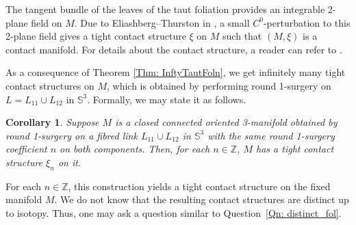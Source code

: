 \documentclass{amsart}
\theoremstyle{plain}
\newtheorem{cor}{Corollary}
\theoremstyle{remark}
\theoremstyle{definition}
\newcommand{\s}{\mathbb{S}}
\begin{document}
The tangent bundle of the leaves of the taut foliation provides an integrable 2-plane field on $ M$. 
Due to Eliashberg--Thurston in \cite{ThursEliashConfol}, a small $C^0$-perturbation to this 2-plane field gives a tight contact structure $\xi$ on $M$ such that $(M,\xi)$ is a contact manifold.
For details about the contact structure, a reader can refer to \cite{Book-HG}. 

As a consequence of Theorem \ref{Thm: InftyTautFoln}, we get infinitely many tight contact structures on $M$, which is obtained by performing round 1-surgery on $L= L_{11} \cup L_{12}$ in $\s^3$. 
Formally, we may state it as follows. 
\begin{cor}
    \label{cor: ExsTightCS}
    Suppose $M$ is a closed connected oriented 3-manifold obtained by round 1-surgery on a fibred link $L_{11}\cup L_{12}$ in $\s^3$ with the same round 1-surgery coefficient $n$ on both components. 
    Then, for each $n\in \mathbb{Z}$, $M$ has a tight contact structure $\xi_n$ on it. 
\end{cor}

For each $n\in \mathbb{Z}$, this construction yields a tight contact structure on the fixed manifold $M$. We do not know that the resulting contact structures are distinct up to isotopy. Thus, one may ask a question similar to Question~\ref{Qn: distinct_fol}. 






\end{document}

